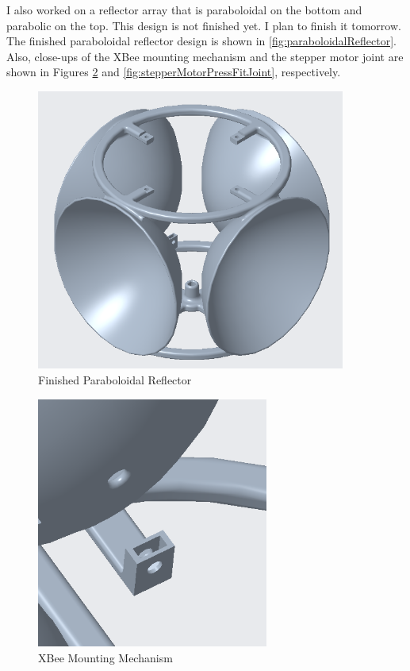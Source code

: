 \documentclass[fontsize=11pt, %
                             paper=letter, %
                             openany, %
                             captions=tableheading,
                             index=totoc,
                             hyperref]{labbook}
\begin{document}
\begin{addmargin}[0cm]{0cm}
\vspace{12pt}
I also worked on a reflector array that is paraboloidal on the bottom and parabolic on the top. This design is not finished yet. I plan to finish it tomorrow. The finished paraboloidal reflector design is shown in \autoref{fig:paraboloidalReflector}. Also, close-ups of the XBee mounting mechanism and the stepper motor joint are shown in Figures \ref{fig:XBeeMountingBracket} and \ref{fig:stepperMotorPressFitJoint}, respectively.

\begin{figure}[h!]
    \center
    \includegraphics[width=4in]{figs/img/paraboloidalReflector.png}
    \caption{Finished Paraboloidal Reflector}
    \label{fig:paraboloidalReflector}
\end{figure}

\begin{figure}[h!]
    \center
    \includegraphics[width=3in]{figs/img/XBeeMountingBracket.png}
    \caption{XBee Mounting Mechanism}
    \label{fig:XBeeMountingBracket}
\end{figure}


\end{addmargin}
\end{document}
